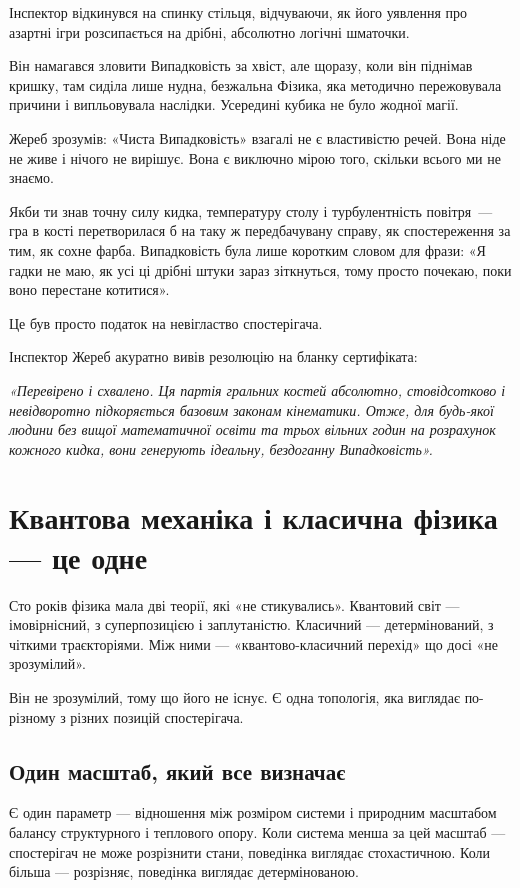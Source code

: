 \documentclass[12pt, a4paper, openany]{book}
\begin{document}
\begin{terrybox}
\medskip
Інспектор відкинувся на спинку стільця, відчуваючи, як його уявлення про азартні ігри розсипається на дрібні, абсолютно логічні шматочки.

Він намагався зловити Випадковість за хвіст, але щоразу, коли він піднімав кришку, там сиділа лише нудна, безжальна Фізика, яка методично пережовувала причини і випльовувала наслідки. Усередині кубика не було жодної магії.

Жереб зрозумів: «Чиста Випадковість» взагалі не є властивістю речей. Вона ніде не живе і нічого не вирішує. Вона є виключно мірою того, скільки всього ми не знаємо.

Якби ти знав точну силу кидка, температуру столу і турбулентність повітря~--- гра в кості перетворилася б на таку ж передбачувану справу, як спостереження за тим, як сохне фарба. Випадковість була лише коротким словом для фрази: «Я гадки не маю, як усі ці дрібні штуки зараз зіткнуться, тому просто почекаю, поки воно перестане котитися».

Це був просто податок на невігластво спостерігача.

\medskip
Інспектор Жереб акуратно вивів резолюцію на бланку сертифіката:

\medskip
\textit{«Перевірено і схвалено. Ця партія гральних костей абсолютно, стовідсотково і невідворотно підкоряється базовим законам кінематики. Отже, для будь-якої людини без вищої математичної освіти та трьох вільних годин на розрахунок кожного кидка, вони генерують ідеальну, бездоганну Випадковість».}
\end{terrybox}

\chapter{Квантова механіка і класична фізика --- це одне}

Сто років фізика мала дві теорії, які «не стикувались». Квантовий світ --- імовірнісний, з суперпозицією і заплутаністю. Класичний --- детермінований, з чіткими траєкторіями. Між ними --- «квантово-класичний перехід» що досі «не зрозумілий».

Він не зрозумілий, тому що його не існує. Є одна топологія, яка виглядає по-різному з різних позицій спостерігача.

\section{Один масштаб, який все визначає}

Є один параметр --- відношення між розміром системи і природним масштабом балансу структурного і теплового опору. Коли система менша за цей масштаб --- спостерігач не може розрізнити стани, поведінка виглядає стохастичною. Коли більша --- розрізняє, поведінка виглядає детермінованою.
\end{document}
